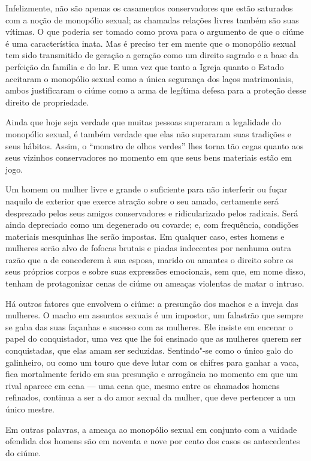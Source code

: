 Infelizmente, não são apenas os casamentos conservadores que estão
saturados com a noção de monopólio sexual; as chamadas relações livres
também são suas vítimas. O que poderia ser tomado como prova para o argumento de que o ciúme é uma característica inata. Mas é
preciso ter em mente que o monopólio sexual tem sido transmitido de
geração a geração como um direito sagrado e a base da perfeição da
família e do lar. E uma vez que tanto a Igreja quanto o Estado
aceitaram o monopólio sexual como a única segurança dos laços
matrimoniais, ambos justificaram o ciúme como a arma de legítima defesa
para a proteção desse direito de propriedade.

Ainda que hoje seja verdade que muitas pessoas superaram a legalidade do
monopólio sexual, é também verdade que elas não superaram suas tradições
e seus hábitos. Assim, o ``monstro de olhos verdes'' lhes torna tão
cegas quanto aos seus vizinhos conservadores no momento em que seus bens
materiais estão em jogo.

Um homem ou mulher livre e grande o suficiente para não interferir ou
fuçar naquilo de exterior que exerce atração sobre o seu amado,
certamente será desprezado pelos seus amigos conservadores e
ridicularizado pelos radicais. Será ainda depreciado como um degenerado
ou covarde; e, com frequência, condições materiais mesquinhas lhe serão
impostas. Em qualquer caso, estes homens e mulheres serão alvo de
fofocas brutais e piadas indecentes por nenhuma outra razão que a de
concederem à sua esposa, marido ou amantes o direito sobre os seus
próprios corpos e sobre suas expressões emocionais, sem que, em nome
disso, tenham de protagonizar cenas de ciúme ou ameaças violentas de
matar o intruso.

Há outros fatores que envolvem o ciúme: a presunção dos machos e a
inveja das mulheres. O macho em assuntos sexuais é um impostor, um
falastrão que sempre se gaba das suas façanhas e sucesso com as
mulheres. Ele insiste em encenar o papel do conquistador, uma vez que
lhe foi ensinado que as mulheres querem ser conquistadas, que elas amam
ser seduzidas. Sentindo"-se como o único galo do galinheiro, ou como um
touro que deve lutar com os chifres para ganhar a vaca, fica mortalmente
ferido em sua presunção e arrogância no momento em que um rival aparece
em cena --- uma cena que, mesmo entre os chamados homens refinados,
continua a ser a do amor sexual da mulher, que deve pertencer a um único
mestre.

Em outras palavras, a ameaça ao monopólio sexual em conjunto com a
vaidade ofendida dos homens são em noventa e nove por cento dos casos os
antecedentes do ciúme.

